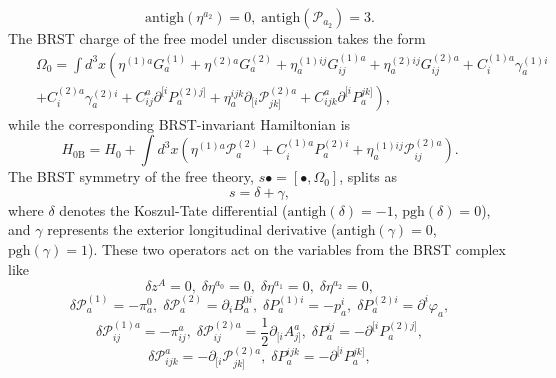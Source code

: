 \documentclass[a4paper,12pt]{article}
\begin{document}
\begin{equation}
\mathrm{antigh}\left( \eta ^{a_{2}}\right) =0,\;\mathrm{antigh}\left( 
\mathcal{P}_{a_{2}}\right) =3.  \label{xx25}
\end{equation}
The BRST charge of the free model under discussion takes the form 
\begin{eqnarray}
&&\Omega _{0}=\int d^{3}x\left( \eta ^{(1)a}G_{a}^{(1)}+\eta
^{(2)a}G_{a}^{(2)}+\eta _{a}^{(1)ij}G_{ij}^{(1)a}+\eta
_{a}^{(2)ij}G_{ij}^{(2)a}+C_{i}^{(1)a}\gamma _{a}^{(1)i}\right.  \nonumber \\
&&\left. +C_{i}^{(2)a}\gamma _{a}^{(2)i}+C_{ij}^{a}\partial
^{[i}P_{a}^{(2)j]}+\eta _{a}^{ijk}\partial _{[i}\mathcal{P}%
_{jk]}^{(2)a}+C_{ijk}^{a}\partial ^{[i}P_{a}^{jk]}\right) ,  \label{xx26}
\end{eqnarray}
while the corresponding BRST-invariant Hamiltonian is 
\begin{equation}
H_{0\mathrm{B}}=H_{0}+\int d^{3}x\left( \eta ^{(1)a}\mathcal{P}%
_{a}^{(2)}+C_{i}^{(1)a}P_{a}^{(2)i}+\eta _{a}^{(1)ij}\mathcal{P}%
_{ij}^{(2)a}\right) .  \label{xx27}
\end{equation}
The BRST symmetry of the free theory, $s\bullet =[\bullet ,\Omega _{0}]$,
splits as 
\begin{equation}
s=\delta +\gamma ,  \label{xx28}
\end{equation}
where $\delta $ denotes the Koszul-Tate differential ($\mathrm{antigh}\left(
\delta \right) =-1$, $\mathrm{pgh}\left( \delta \right) =0$), and $\gamma $
represents the exterior longitudinal derivative ($\mathrm{antigh}\left(
\gamma \right) =0$, $\mathrm{pgh}\left( \gamma \right) =1$). These two
operators act on the variables from the BRST complex like 
\begin{equation}
\delta z^{A}=0,\;\delta \eta ^{a_{0}}=0,\;\delta \eta ^{a_{1}}=0,\;\delta
\eta ^{a_{2}}=0,  \label{xx29}
\end{equation}
\begin{equation}
\delta \mathcal{P}_{a}^{(1)}=-\pi _{a}^{0},\;\delta \mathcal{P}%
_{a}^{(2)}=\partial _{i}B_{a}^{0i},\;\delta P_{a}^{(1)i}=-p_{a}^{i},\;\delta
P_{a}^{(2)i}=\partial ^{i}\varphi _{a},  \label{xx30}
\end{equation}
\begin{equation}
\delta \mathcal{P}_{ij}^{(1)a}=-\pi _{ij}^{a},\;\delta \mathcal{P}%
_{ij}^{(2)a}=\frac{1}{2}\partial _{[i}A_{j]}^{a},\;\delta
P_{a}^{ij}=-\partial ^{[i}P_{a}^{(2)j]},  \label{xx31}
\end{equation}
\begin{equation}
\delta \mathcal{P}_{ijk}^{a}=-\partial _{[i}\mathcal{P}_{jk]}^{(2)a},\;%
\delta P_{a}^{ijk}=-\partial ^{[i}P_{a}^{jk]},  \label{xx32}
\end{equation}
\end{document}
